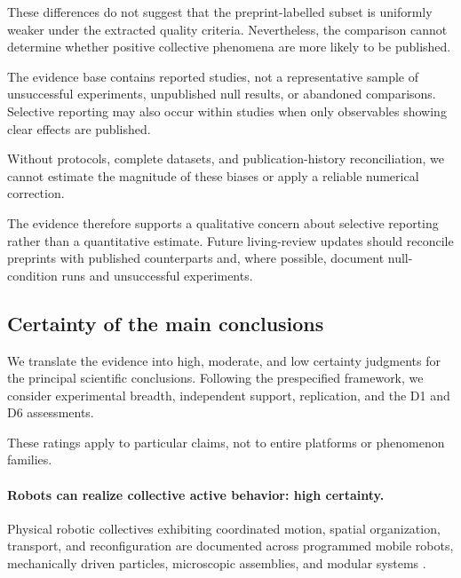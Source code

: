 These differences do not suggest
that the preprint-labelled subset
is uniformly weaker under the
extracted quality criteria.
Nevertheless, the comparison
cannot determine whether positive
collective phenomena are more
likely to be published.

The evidence base contains
reported studies, not a
representative sample of
unsuccessful experiments,
unpublished null results,
or abandoned comparisons.
Selective reporting may
also occur within studies
when only observables
showing clear effects
are published.

Without protocols, complete
datasets, and publication-history
reconciliation, we cannot estimate
the magnitude of these biases
or apply a reliable numerical
correction.

The evidence therefore supports
a qualitative concern about
selective reporting rather than
a quantitative estimate.
Future living-review updates
should reconcile preprints
with published counterparts
and, where possible, document
null-condition runs and
unsuccessful experiments.

\subsection{Certainty of the main conclusions}
\label{sec:discussion-certainty}

We translate the evidence into high, moderate,
and low certainty judgments for the principal
scientific conclusions. Following the prespecified
framework, we consider experimental breadth,
independent support, replication, and the
D1 and D6 assessments.

These ratings apply to particular claims,
not to entire platforms or phenomenon families.

\paragraph*{Robots can realize collective active behavior: high certainty.}

Physical robotic collectives exhibiting coordinated
motion, spatial organization, transport, and
reconfiguration are documented across
programmed mobile robots, mechanically driven
particles, microscopic assemblies, and
modular systems
\cite{Rubenstein2014programmableselfas,Vsrhelyi2018optimizedflockingo,Welch2018aggregatesuppressio,Li2019particleroboticsba,Yigit2019programmablecollect,Buerle2020formationofstable,Savoie2019arobotmadeofrobo,Xie2020bioinspiredsoftmic,Yang2022emergentmicroroboti,Xi2024emergentintelligenc,Wang2025hyperuniformnetwork}.

